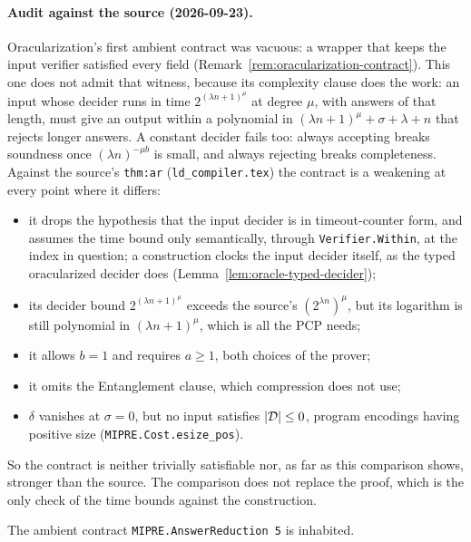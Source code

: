 \paragraph{Audit against the source (2026-09-23).} Oracularization's first ambient contract
was vacuous: a wrapper that keeps the input verifier satisfied every field
(Remark~\ref{rem:oracularization-contract}). This one does not admit that witness, because its complexity clause does the work: an input whose
decider runs in time $2^{(\lambda n+1)^\mu}$ at degree $\mu$, with answers of that length, must
give an output within a polynomial in $(\lambda n+1)^\mu+\sigma+\lambda+n$ that rejects longer answers.
A constant decider fails too: always accepting breaks soundness once $(\lambda n)^{-\mu b}$ is
small, and always rejecting breaks completeness. Against the source's \texttt{thm:ar}
(\texttt{ld\_compiler.tex}) the contract is a weakening at every point where it differs:
\begin{itemize}
\item it drops the hypothesis that the input decider is in timeout-counter form, and assumes
  the time bound only semantically, through \texttt{Verifier.Within}, at the index in
  question; a construction clocks the input decider itself, as the typed oracularized decider
  does (Lemma~\ref{lem:oracle-typed-decider});
\item its decider bound $2^{(\lambda n+1)^\mu}$ exceeds the source's $(2^{\lambda n})^\mu$, but its
  logarithm is still polynomial in $(\lambda n+1)^\mu$, which is all the PCP needs;
\item it allows $b = 1$ and requires $a \geq 1$, both choices of the prover;
\item it omits the Entanglement clause, which compression does not use;
\item $\delta$ vanishes at $\sigma = 0$, but no input satisfies $\left\vert {\mathcal{D}} \right\vert \leq 0$, program
  encodings having positive size (\texttt{MIPRE.Cost.esize\_pos}).
\end{itemize}
So the contract is neither trivially satisfiable nor, as far as this comparison shows,
stronger than the source. The comparison does not replace the proof, which is the only check
of the time bounds against the construction.

\begin{lemma}
\label{lem:answer-reduction-supply}
\leanok
The ambient contract \texttt{MIPRE.AnswerReduction 5} is inhabited.
\end{lemma}

